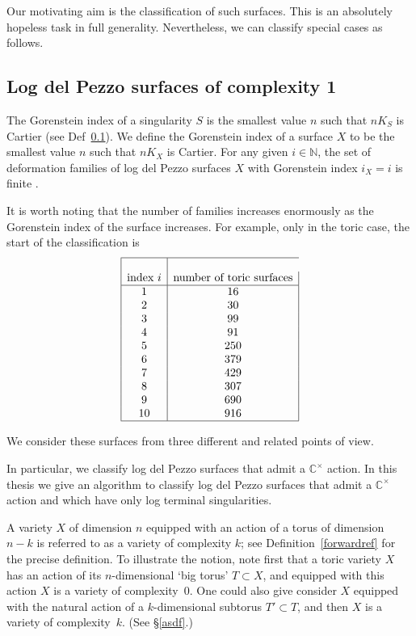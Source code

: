 \documentclass[12pt]{amsart}
\theoremstyle{definition}
\theoremstyle{definition}
\theoremstyle{definition}
\theoremstyle{definition}
\theoremstyle{definition}
\theoremstyle{definition}
\theoremstyle{definition}
\theoremstyle{definition}
\begin{document}
Our motivating aim is the classification of such surfaces.
This is an absolutely hopeless task in full generality.
Nevertheless, we can classify special cases as follows.

\subsection{Log del Pezzo surfaces of complexity 1}
The Gorenstein index of a singularity $S$ is the smallest value $n$ such that $n K_S$ is Cartier (see Def~\ref{}). We define the Gorenstein index of a surface $X$ to be the smallest value $n$ such that $nK_X$ is Cartier.
For any given $i \in \mathbb{N}$, the set of deformation
families of log del Pezzo surfaces $X$ with Gorenstein index $i_X=i$
is finite \cite{f}.

It is worth noting that the number of families increases enormously as the Gorenstein
index of the surface increases. For example, only in the toric case, 
the start of the classification is
\[
\begin{array}{|c|c|}
\hline\\
\text{index $i$} & \text{number of toric surfaces}\\ \hline
1 & 16 \\
2 & 30 \\
3 & 99  \\
4 & 91  \\
5 & 250 \\
6 & 379 \\
7 & 429 \\
8 & 307 \\
9 & 690 \\
10 & 916 \\
\hline
\end{array}
\]

We consider these surfaces from three different and related points of view.

In particular, we classify log del Pezzo surfaces that admit a $\mathbb{C}^\times$ action.
In this thesis we give an algorithm to classify log del Pezzo surfaces that admit a $\mathbb{C}^\times$ action and which have only log terminal singularities. 


A variety $X$ of dimension $n$ equipped with an action of a torus of dimension $n-k$ is referred to as a variety of complexity $k$; see Definition~\ref{forwardref} for the precise definition. To illustrate the notion, note first that a toric variety $X$ has an action of its $n$-dimensional `big torus' $T\subset X$, and equipped with this action $X$ is a variety of complexity~0.
One could also give consider $X$ equipped with the natural action of a $k$-dimensional
subtorus $T'\subset T$, and then $X$ is a variety of complexity~$k$. (See \S\ref{asdf}.)
\end{document}
